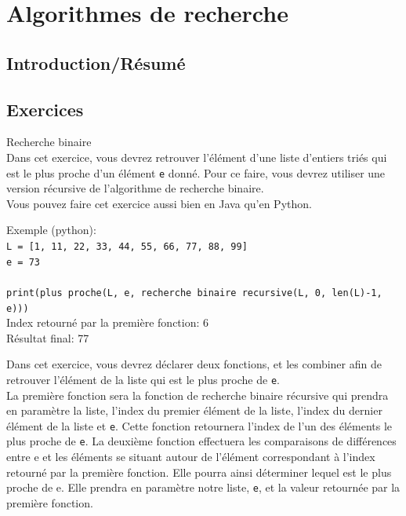 \section{Algorithmes de recherche}

\subsection{Introduction/Résumé}

\subsection{Exercices}

\begin{Exercice}[15min] Recherche binaire \\

Dans cet exercice, vous devrez retrouver l'élément d'une liste d'entiers triés qui est le plus proche d'un élément \lstinline{e} donné. Pour ce faire, vous devrez utiliser une version récursive de l'algorithme de recherche binaire.\\

Vous pouvez faire cet exercice aussi bien en Java qu'en Python.

Exemple (python):\\

\lstinline{L = [1, 11, 22, 33, 44, 55, 66, 77, 88, 99]}\\
\lstinline{e = 73}\\\\
\lstinline{print(plus proche(L, e, recherche binaire recursive(L, 0, len(L)-1, e)))}\\

Index retourné par la première fonction: 6\\
Résultat final: 77\\


\begin{conseil}
   Dans cet exercice, vous devrez déclarer deux fonctions, et les combiner afin de retrouver l'élément de la liste qui est le plus proche de \lstinline{e}.\\
   
   La première fonction sera la fonction de recherche binaire récursive qui prendra en paramètre la liste, l'index du premier élément de la liste, l'index du dernier élément de la liste et \lstinline{e}. Cette fonction retournera l'index de l'un des éléments le plus proche de \lstinline{e}. 
   La deuxième fonction effectuera les comparaisons de différences entre e et les éléments se situant autour de l'élément correspondant à l'index retourné par la première fonction. Elle pourra ainsi déterminer lequel est le plus proche de e. Elle prendra en paramètre notre liste, \lstinline{e}, et la valeur retournée par la première fonction. \\
\end{conseil}


\end{Exercice}
